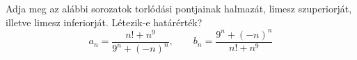 \documentclass[11pt]{scrartcl}
\begin{document}
Adja meg az alábbi sorozatok torlódási pontjainak halmazát, limesz
szuperiorját, illetve limesz inferiorját. Létezik-e határérték?
\[
	a_n = \frac{n! + n^9}{9^n + (-n)^n}, \qquad
	b_n = \frac{9^n + (-n)^n}{n! + n^9}
\]
\end{document}
